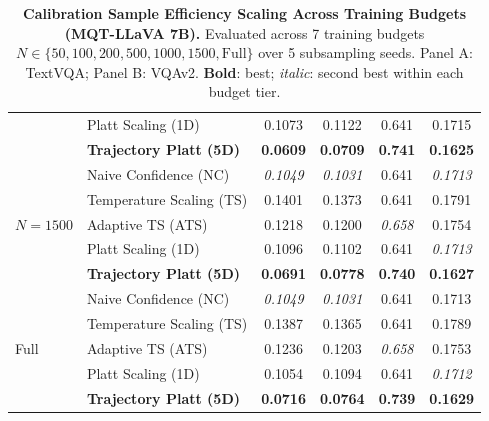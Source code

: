 \begin{table}[t]
\begin{tabular}{llcccc}
 & Platt Scaling (1D) & 0.1073 & 0.1122 & 0.641 & 0.1715 \\
 & \textbf{Trajectory Platt (5D)} & \textbf{0.0609} & \textbf{0.0709} & \textbf{0.741} & \textbf{0.1625} \\
\midrule
\multirow{5}{*}{$N = 1500$} & Naive Confidence (NC) & \textit{0.1049} & \textit{0.1031} & 0.641 & \textit{0.1713} \\
 & Temperature Scaling (TS) & 0.1401 & 0.1373 & 0.641 & 0.1791 \\
 & Adaptive TS (ATS) & 0.1218 & 0.1200 & \textit{0.658} & 0.1754 \\
 & Platt Scaling (1D) & 0.1096 & 0.1102 & 0.641 & \textit{0.1713} \\
 & \textbf{Trajectory Platt (5D)} & \textbf{0.0691} & \textbf{0.0778} & \textbf{0.740} & \textbf{0.1627} \\
\midrule
\multirow{5}{*}{Full} & Naive Confidence (NC) & \textit{0.1049} & \textit{0.1031} & 0.641 & 0.1713 \\
 & Temperature Scaling (TS) & 0.1387 & 0.1365 & 0.641 & 0.1789 \\
 & Adaptive TS (ATS) & 0.1236 & 0.1203 & \textit{0.658} & 0.1753 \\
 & Platt Scaling (1D) & 0.1054 & 0.1094 & 0.641 & \textit{0.1712} \\
 & \textbf{Trajectory Platt (5D)} & \textbf{0.0716} & \textbf{0.0764} & \textbf{0.739} & \textbf{0.1629} \\
\bottomrule
\end{tabular}
\caption{\textbf{Calibration Sample Efficiency Scaling Across Training Budgets (MQT-LLaVA 7B).} Evaluated across 7 training budgets $N \in \{50, 100, 200, 500, 1000, 1500, \text{Full}\}$ over 5 subsampling seeds. Panel A: TextVQA; Panel B: VQAv2. \textbf{Bold}: best; \textit{italic}: second best within each budget tier.}
\label{tab:sample_efficiency_macro_mqt}
\end{table}
